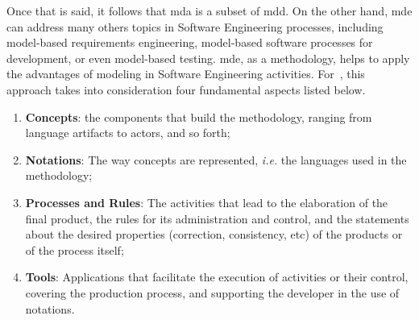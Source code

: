 Once that is said, it follows that \ac{mda} is a subset of \ac{mdd}.
On the other hand, \ac{mde} can address many others topics in Software Engineering processes, including model-based requirements engineering, model-based software processes for development, or even model-based testing.
\ac{mde}, as a methodology, helps to apply the advantages of modeling in Software Engineering activities.
For~\cite{Brambilla:2017}, this approach takes into consideration four fundamental aspects listed below.


\begin{enumerate}
   \item \textbf{Concepts}: the components that build the methodology, ranging from language artifacts to actors, and so forth;
   \item \textbf{Notations}: The way concepts are represented, \textit{i.e.} the languages used in the methodology;
   \item \textbf{Processes and Rules}: The activities that lead to the elaboration of the final product, the rules for its administration and control, and the statements about the desired properties (correction, consistency, etc) of the products or of the process itself;
   \item \textbf{Tools}: Applications that facilitate the execution of activities or their control, covering the production process, and supporting the developer in the use of notations.
\end{enumerate}

